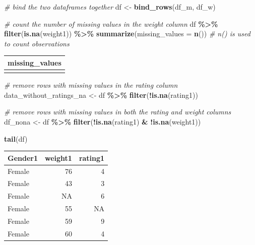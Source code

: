 \documentclass[
]{article}
\newenvironment{Shaded}{\begin{snugshade}}{\end{snugshade}}
\newcommand{\AttributeTok}[1]{\textcolor[rgb]{0.13,0.29,0.53}{#1}}
\newcommand{\CommentTok}[1]{\textcolor[rgb]{0.56,0.35,0.01}{\textit{#1}}}
\newcommand{\FunctionTok}[1]{\textcolor[rgb]{0.13,0.29,0.53}{\textbf{#1}}}
\newcommand{\NormalTok}[1]{#1}
\newcommand{\OtherTok}[1]{\textcolor[rgb]{0.56,0.35,0.01}{#1}}
\newcommand{\SpecialCharTok}[1]{\textcolor[rgb]{0.81,0.36,0.00}{\textbf{#1}}}
\begin{document}
\begin{Shaded}
\begin{Highlighting}[]
\CommentTok{\# bind the two dataframes together}
\NormalTok{df }\OtherTok{\textless{}{-}} \FunctionTok{bind\_rows}\NormalTok{(df\_m, df\_w)}

\CommentTok{\# count the number of missing values in the weight column}
\NormalTok{df }\SpecialCharTok{\%\textgreater{}\%}
  \FunctionTok{filter}\NormalTok{(}\FunctionTok{is.na}\NormalTok{(weight1)) }\SpecialCharTok{\%\textgreater{}\%}
  \FunctionTok{summarize}\NormalTok{(}\AttributeTok{missing\_values =} \FunctionTok{n}\NormalTok{()) }\CommentTok{\# n() is used to count observations}
\end{Highlighting}
\end{Shaded}

\begin{longtable}[]{@{}r@{}}
\toprule\noalign{}
missing\_values \\
\midrule\noalign{}
\endhead
\bottomrule\noalign{}
\endlastfoot
2 \\
\end{longtable}

\begin{Shaded}
\begin{Highlighting}[]
\CommentTok{\# remove rows with missing values in the rating column}
\NormalTok{data\_without\_ratings\_na }\OtherTok{\textless{}{-}}\NormalTok{ df }\SpecialCharTok{\%\textgreater{}\%}
  \FunctionTok{filter}\NormalTok{(}\SpecialCharTok{!}\FunctionTok{is.na}\NormalTok{(rating1))}

\CommentTok{\# remove rows with missing values in both the rating and weight columns}
\NormalTok{df\_nona }\OtherTok{\textless{}{-}}\NormalTok{ df }\SpecialCharTok{\%\textgreater{}\%}
  \FunctionTok{filter}\NormalTok{(}\SpecialCharTok{!}\FunctionTok{is.na}\NormalTok{(rating1) }\SpecialCharTok{\&} \SpecialCharTok{!}\FunctionTok{is.na}\NormalTok{(weight1))}

\FunctionTok{tail}\NormalTok{(df)}
\end{Highlighting}
\end{Shaded}

\begin{longtable}[]{@{}lrr@{}}
\toprule\noalign{}
Gender1 & weight1 & rating1 \\
\midrule\noalign{}
\endhead
\bottomrule\noalign{}
\endlastfoot
Female & 76 & 4 \\
Female & 43 & 3 \\
Female & NA & 6 \\
Female & 55 & NA \\
Female & 59 & 9 \\
Female & 60 & 4 \\
\end{longtable}
\end{document}
